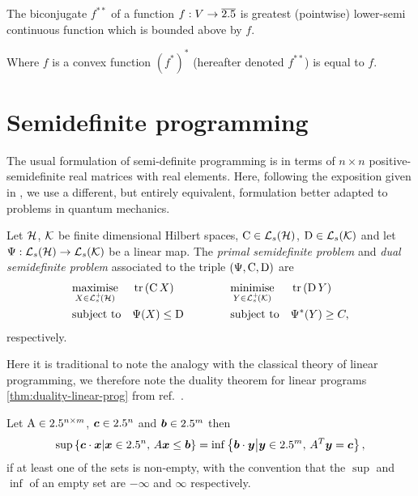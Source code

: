 \begin{thm}
  The biconjugate $f^{**}$ of a function $f:V\to\overline{2.5}$ is greatest (pointwise) lower-semi continuous function which is bounded above by $f$.
\end{thm}

Where $f$ is a convex function $(f^*)^*$ (hereafter denoted $f^{**}$) is equal to $f$.

\section{Semidefinite programming}

The usual formulation  of semi-definite programming is in terms of $n\times n$ positive-semidefinite real matrices with real elements. Here, following the exposition given in \cite{w-semidefinite-prog-cb-norms}, we use a different, but entirely equivalent, formulation better adapted to problems in quantum mechanics. 

\begin{defn}\label{defn:complex-semidefinite-program}
  Let $\mathcal{H}$, $\mathcal{K}$ be finite dimensional Hilbert spaces, $\opc\in\saops[\hcal]$, $\opd\in\saops[\kcal]$ and let $\Psi:\saops[\hcal]\to\saops[\kcal]$ be a linear map. The \emph{primal semidefinite problem} and \emph{dual semidefinite problem}  associated to the triple $\left(\Psi, \operatorname{C}, \operatorname{D}\right)$ are
  \begin{equation}
  \begin{aligned}
    & \underset{X\in\posops[\hcal]}{\text{maximise}} & &\tr{\opc X } \qquad\qquad & & \underset{Y\in\posops[\kcal]}{\text{minimise}} & & \tr{\opd Y} \\
    & \text{subject to} & &\Psi(X) \leq \opd & & \text{subject to} & &  \Psi^*(Y) \geq C,
  \end{aligned}
  \label{eqn:semidefinite-program}
\end{equation}
respectively.
\end{defn}

Here it is traditional to note the analogy with the classical theory of linear programming,  we therefore note the duality theorem for linear programs \eqref{thm:duality-linear-prog} from ref.~\cite{schrijver-lin-int-prog}.
\begin{thm}\label{thm:duality-linear-prog}
  Let $\operatorname{A}\in2.5^{n\times m}$, $\bm{c}\in2.5^n$ and $\bm{b}\in2.5^m$ then
  \begin{align}
    \sup\left\{\bm{c}\cdot \bm{x} \middle| \bm{x}\in2.5^n,\, A \bm{x} \leq \bm{b}\right \} = \inf\left\{ \bm{b}\cdot\bm{y} \middle|\bm{y}\in2.5^m,\, A^T \bm{y}= \bm{c}\right \},
  \end{align}
  if at least one of the sets is non-empty, with the convention that the $\sup$ and $\inf$ of an empty set are $-\infty$ and $\infty$ respectively.
\end{thm}
  
